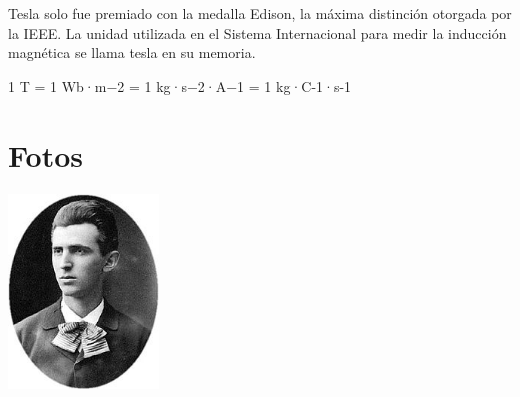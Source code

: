 \documentclass[a4paper,openright,12pt]{report}
\begin{document}
\begin{large}
\begin{flushleft}
Tesla solo fue premiado con la medalla Edison, la máxima distinción otorgada por la IEEE.
La unidad utilizada en el Sistema Internacional para medir la inducción magnética se llama tesla en su memoria.\\

\vspace*{0.6in}

\begin{center}
{\Large 1 T = 1 Wb·m−2 = 1 kg·s−2·A−1 = 1 kg·C-1·s-1}
\end{center}
\end{flushleft}

\chapter{Fotos}\label{cap.desenlace}
\begin{center}
\includegraphics[width=4cm]{Tesla.jpg}
\end{center}

\end{large}
\end{document}

